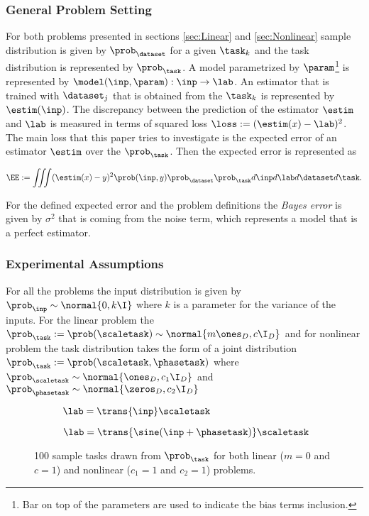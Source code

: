 \subsubsection{General Problem Setting}
For both problems presented in sections \ref{sec:Linear} and \ref{sec:Nonlinear} sample distribution is given by $\prob_\dataset$ for a given $\task_{k}$ and the task distribution is represented by $\prob_\task$. A model parametrized by $\param$\footnote{Bar on top of the parameters are used to indicate the bias terms inclusion.} is represented by $\model(\inp, \param):\inp\to\lab$. An estimator that is trained with $\dataset_{j}$ that is obtained from the $\task_k$ is represented by $\estim(\inp)$. The discrepancy between the prediction of the estimator $\estim$ and $\lab$ is measured in terms of squared loss $\loss:=(\estim(x)-\lab)^2$. The main loss that this paper tries to investigate is the expected error of an estimator $\estim$ over the $\prob_{\task}$. Then the expected error is represented as

\begin{equation}\label{eq:ee}
  \EE:= \iiint(\estim(x) - y)^2\prob(\inp, y)\prob_{\dataset}\prob_{\task} d\inp d\lab d\dataset d\task.
\end{equation}

For the defined expected error and the problem definitions the \textit{Bayes error} is given by $\sigma^2$ that is coming from the noise term, which represents a model that is a perfect estimator.

\subsubsection{Experimental Assumptions}
For all the problems the input distribution is given by $\prob_\inp\sim\normal{0,k\I}$ where $k$ is a parameter for the variance of the inputs. For the linear problem the $\prob_\task:=\prob(\scaletask)\sim\normal{{m\ones_{D}},{c\I_{D}}}$ and for nonlinear problem the task distribution takes the form of a joint distribution $\prob_\task:=\prob(\scaletask, \phasetask)$ where $\prob_{\scaletask}\sim\normal{\ones_{D},c_1\I_{D}}$ and $\prob_{\phasetask}\sim\normal{\zeros_{D},c_2\I_{D}}$


\begin{figure}[ht!]
  \centering
  \begin{subfigure}[b]{0.49\textwidth}
    \centering
    \caption{$\lab = \trans{\inp}\scaletask$}
    \label{fig:lintasks}
  \end{subfigure}
  \begin{subfigure}[b]{0.49\textwidth}
    \centering
    \caption{$\lab = \trans{\sine(\inp+\phasetask)}\scaletask$}
    \label{fig:nonlintasks}
  \end{subfigure}
  \caption{100 sample tasks drawn from $\prob_\task$ for both linear ($m=0$ and $c=1$) and nonlinear ($c_1=1$ and $c_2=1$) problems.}
\end{figure}

